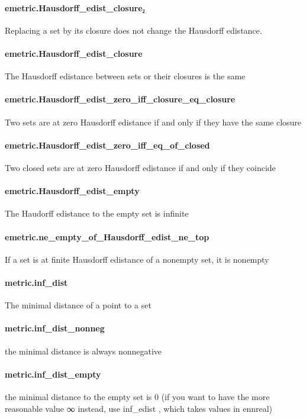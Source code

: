\documentclass{article}
\begin{document}
\paragraph{emetric.Hausdorff\_edist\_closure₂}
\par
Replacing a set by its closure does not change the Hausdorff edistance.
\paragraph{emetric.Hausdorff\_edist\_closure}
\par
The Hausdorff edistance between sets or their closures is the same
\paragraph{emetric.Hausdorff\_edist\_zero\_iff\_closure\_eq\_closure}
\par
Two sets are at zero Hausdorff edistance if and only if they have the same closure
\paragraph{emetric.Hausdorff\_edist\_zero\_iff\_eq\_of\_closed}
\par
Two closed sets are at zero Hausdorff edistance if and only if they coincide
\paragraph{emetric.Hausdorff\_edist\_empty}
\par
The Haudorff edistance to the empty set is infinite
\paragraph{emetric.ne\_empty\_of\_Hausdorff\_edist\_ne\_top}
\par
If a set is at finite Hausdorff edistance of a nonempty set, it is nonempty
\paragraph{metric.inf\_dist}
\par
The minimal distance of a point to a set
\paragraph{metric.inf\_dist\_nonneg}
\par
the minimal distance is always nonnegative
\paragraph{metric.inf\_dist\_empty}
\par
the minimal distance to the empty set is 0 (if you want to have the more reasonable
value ∞ instead, use 
\colorbox[RGB]{253,246,227}{{{{\color[RGB]{101, 123, 131} inf\_edist }}}}, which takes values in ennreal)
\end{document}
